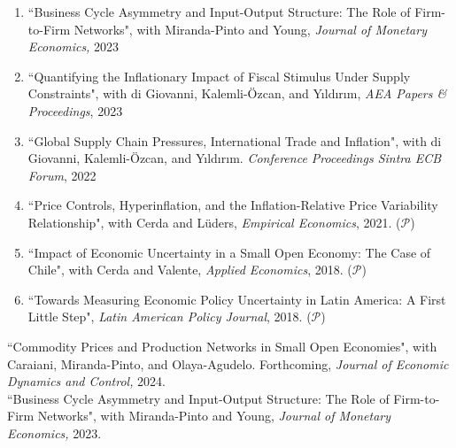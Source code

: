 \documentclass[10pt]{article}
\begin{document}
\begin{enumerate}[wide, labelwidth=!, labelindent=0pt]
 \item ``Business Cycle Asymmetry and Input-Output Structure: The Role of Firm-to-Firm Networks", with Miranda-Pinto and Young, \emph{Journal of Monetary Economics,} 2023\\[-0.125in]

\item \noindent ``Quantifying the Inflationary Impact of Fiscal Stimulus Under Supply Constraints", with di Giovanni, Kalemli-\"{O}zcan, and Y{\i}ld{\i}r{\i}m, \emph{AEA Papers \& Proceedings}, 2023\\[-0.125in]

\item \noindent ``Global Supply Chain Pressures, International Trade and Inflation", with di Giovanni, Kalemli-\"{O}zcan, and Y{\i}ld{\i}r{\i}m. {\emph{Conference Proceedings Sintra ECB Forum}, 2022}\\[-0.125in]

\item \noindent ``Price Controls, Hyperinflation, and the Inflation-Relative Price Variability Relationship", with Cerda and L\"{u}ders, \emph{Empirical Economics}, 2021. ($\mathcal{P}$)\\[-0.125in]

\item \noindent ``Impact of Economic Uncertainty in a Small Open Economy: The Case of Chile", with Cerda and Valente, \emph{Applied Economics}, 2018. ($\mathcal{P}$)\\[-0.125in]

\item \noindent ``Towards Measuring Economic Policy Uncertainty in Latin America: A First Little Step", \emph{Latin American Policy Journal}, 2018. ($\mathcal{P}$)\\[-0.125in]
\end{enumerate}
\fi

\noindent ``Commodity Prices and Production Networks in Small Open Economies", with Caraiani, Miranda-Pinto, and Olaya-Agudelo. Forthcoming, \textit{Journal of Economic Dynamics and Control,} 2024.\\[-0.125in]


\noindent ``Business Cycle Asymmetry and Input-Output Structure: The Role of Firm-to-Firm Networks", with Miranda-Pinto and Young, \textit{Journal of Monetary Economics,} 2023.\\[-0.125in]
\end{document}

